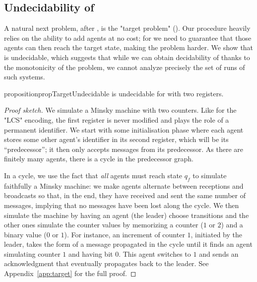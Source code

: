 \subsection{Undecidability of \TARGET}
\label{sec:undec-target}

A natural next problem, after \COVER, is the "target problem" (\TARGET).  
Our \COVER procedure heavily relies on the ability to add agents at no cost; for \TARGET we need to guarantee that those agents can then reach the target state, making the problem harder. 
We show that \TARGET is undecidable, which suggests that while we can obtain decidability of \COVER thanks to the monotonicity of the problem, we cannot analyze precisely the set of runs of such systems.

\begin{restatable}{proposition}{propTargetUndecidable}
\label{prop:target-undec}
\TARGET is undecidable for \BNRA with two registers.
\end{restatable}

\begin{proof}[Proof sketch]
We simulate a Minsky machine with two counters. Like for the "LCS" encoding, the first register is never modified and plays the role of a permanent identifier. We start with some initialisation phase where each agent stores some other agent's identifier in its second register, which will be its ``predecessor''; it then only accepts messages from its predecessor. As there are finitely many agents, there is a cycle in the predecessor graph. 

In a cycle, we use the fact that \emph{all} agents must reach state $q_f$ to simulate faithfully a Minsky machine: we make agents alternate between receptions and broadcasts so that, in the end, they have received and sent the same number of messages, implying that no messages have been lost along the cycle.
We then simulate the machine by having an agent (the leader) choose transitions and the other ones simulate the counter values by memorizing a counter ($1$ or $2$) and a binary value ($0$ or $1$). For instance, an increment of counter $1$, initiated by the leader, takes the form of a message propagated in the cycle until it finds an agent simulating counter $1$ and having bit $0$. This agent switches to $1$ and sends an acknowledgment that eventually propagates back to the leader. See Appendix~\ref{app:target} for the full proof. 
\end{proof}
